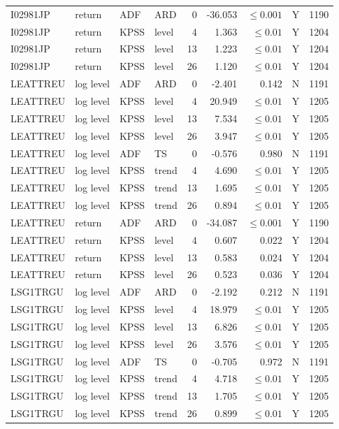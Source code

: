 {\begin{longtable}{@{}llllrrrrr@{}}
I02981JP & return & ADF & ARD & 0 & -36.053 & $\leq 0.001$ & Y & 1190\\
I02981JP & return & KPSS & level & 4 & 1.363 & $\leq 0.01$ & Y & 1204\\
I02981JP & return & KPSS & level & 13 & 1.223 & $\leq 0.01$ & Y & 1204\\
I02981JP & return & KPSS & level & 26 & 1.120 & $\leq 0.01$ & Y & 1204\\
LEATTREU & log level & ADF & ARD & 0 & -2.401 & 0.142 & N & 1191\\
LEATTREU & log level & KPSS & level & 4 & 20.949 & $\leq 0.01$ & Y & 1205\\
LEATTREU & log level & KPSS & level & 13 & 7.534 & $\leq 0.01$ & Y & 1205\\
LEATTREU & log level & KPSS & level & 26 & 3.947 & $\leq 0.01$ & Y & 1205\\
LEATTREU & log level & ADF & TS & 0 & -0.576 & 0.980 & N & 1191\\
LEATTREU & log level & KPSS & trend & 4 & 4.690 & $\leq 0.01$ & Y & 1205\\
LEATTREU & log level & KPSS & trend & 13 & 1.695 & $\leq 0.01$ & Y & 1205\\
LEATTREU & log level & KPSS & trend & 26 & 0.894 & $\leq 0.01$ & Y & 1205\\
LEATTREU & return & ADF & ARD & 0 & -34.087 & $\leq 0.001$ & Y & 1190\\
LEATTREU & return & KPSS & level & 4 & 0.607 & 0.022 & Y & 1204\\
LEATTREU & return & KPSS & level & 13 & 0.583 & 0.024 & Y & 1204\\
LEATTREU & return & KPSS & level & 26 & 0.523 & 0.036 & Y & 1204\\
LSG1TRGU & log level & ADF & ARD & 0 & -2.192 & 0.212 & N & 1191\\
LSG1TRGU & log level & KPSS & level & 4 & 18.979 & $\leq 0.01$ & Y & 1205\\
LSG1TRGU & log level & KPSS & level & 13 & 6.826 & $\leq 0.01$ & Y & 1205\\
LSG1TRGU & log level & KPSS & level & 26 & 3.576 & $\leq 0.01$ & Y & 1205\\
LSG1TRGU & log level & ADF & TS & 0 & -0.705 & 0.972 & N & 1191\\
LSG1TRGU & log level & KPSS & trend & 4 & 4.718 & $\leq 0.01$ & Y & 1205\\
LSG1TRGU & log level & KPSS & trend & 13 & 1.705 & $\leq 0.01$ & Y & 1205\\
LSG1TRGU & log level & KPSS & trend & 26 & 0.899 & $\leq 0.01$ & Y & 1205\\

\end{longtable}}
